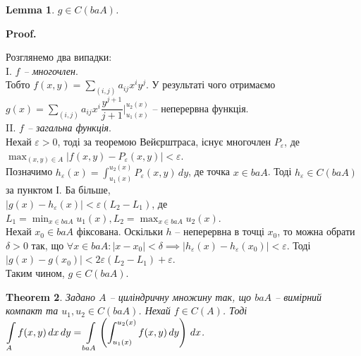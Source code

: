 \documentclass[a4paper, 10pt]{article}
\makeatletter
\def\qed{$\blacksquare$}
\theoremstyle{theoremdd}
\newtheorem{theorem}{Theorem}[subsection]
\theoremstyle{theoremdd}
\theoremstyle{theoremdd}
\theoremstyle{theoremdd}
\theoremstyle{theoremdd}
\theoremstyle{theoremdd}
\theoremstyle{theoremdd}
\newtheorem{lemma}[theorem]{Lemma}
\theoremstyle{theoremdd}
\renewenvironment{proof}[1][Proof.\\]{\par
\pushQED{\hfill \qed}%
\normalfont \topsep6\p@\@plus6\p@\relax
\trivlist
\item\relax
{\bfseries
#1\@addpunct{.}}\hspace\labelsep\ignorespaces
}{%
\popQED\endtrivlist\@endpefalse
}
\makeatother
\begin{document}
\begin{lemma}
$g \in C(baA)$.
\end{lemma}

\begin{proof}
Розглянемо два випадки:\\
I. \textit{$f$ -- многочлен}.\\
Тобто $f(x,y) = \displaystyle\sum_{(i,j)} a_{ij} x^i y^j$. У результаті чого отримаємо $g(x) = \displaystyle\sum_{(i,j)} a_{ij} x^i \dfrac{y^{j+1}}{j+1} \Big|_{u_1(x)}^{u_2(x)}$ -- неперервна функція.\\
II. \textit{$f$ -- загальна функція}. \\
Нехай $\varepsilon > 0$, тоді за теоремою Вейєрштраса, існує многочлен $P_\varepsilon$, де $\displaystyle\max_{(x,y) \in A} |f(x,y) - P_\varepsilon(x,y)| < \varepsilon$.\\
Позначимо $h_\varepsilon(x) = \displaystyle\int_{u_1(x)}^{u_2(x)}P_\varepsilon(x,y)\,dy$, де точка $x \in baA$. Тоді $h_\varepsilon \in C(baA)$ за пунктом І. Ба більше,\\
$|g(x)-h_\varepsilon(x)| < \varepsilon (L_2-L_1)$, де $L_1 = \displaystyle\min_{x \in baA} u_1(x), L_2 = \displaystyle\max_{x \in baA} u_2(x)$.\\
Нехай $x_0 \in baA$ фіксована. Оскільки $h$ -- неперервна в точці $x_0$, то можна обрати $\delta > 0$ так, що $\forall x \in baA: |x-x_0| < \delta \implies |h_\varepsilon(x)-h_\varepsilon(x_0)| < \varepsilon$. Тоді $|g(x)-g(x_0)| < 2\varepsilon(L_2-L_1)+\varepsilon$.\\
Таким чином, $g \in C(baA)$.
\end{proof}

\begin{theorem}
Задано $A$ -- циліндричну множину так, що $baA$ -- вимірний компакт та $u_1,u_2 \in C(baA)$. Нехай $f \in C(A)$. Тоді $\displaystyle\int\displaylimits_A f(x,y)\,dx\,dy = \int\displaylimits_{baA} \left( \int_{u_1(x)}^{u_2(x)} f(x,y)\,dy \right)\,dx$.
\end{theorem}
\end{document}
